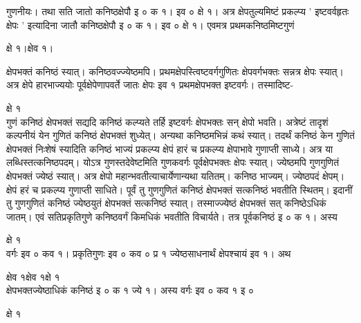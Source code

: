 \documentclass[11pt, openany]{book}
\begin{document}
\begin{sloppypar}
\hangindent=0.2in गुणनीयः। तथा सति जातो कनिष्ठक्षेपौ इ ० क १। इव ० क्षे १। अत्र क्षेपतुल्यमिष्टं प्रकल्प्य ' इष्टवर्वहृतः क्षेपः ' इत्यादिना जातौ कनिष्ठक्षेपौ इ ० क १। इव ० क्षे १। एवमत्र प्रथमकनिष्ठमिष्टगुणं 

\hspace{3in}क्षे १।\hspace{0.3in}क्षेव १।

\hangindent=0.2in क्षेपभक्तं कनिष्ठं स्यात्। कनिष्ठवज्ज्येष्ठमपि। प्रथमक्षेपस्त्विष्टवर्गगुणितः क्षेपवर्गभक्तः सन्नत्र क्षेपः स्यात्। अत्र क्षेपे हारभाज्ययोः पूर्वक्षेपेणापवर्ते जातः क्षेपः इव १ प्रथमक्षेपभक्त इष्टवर्गः। तस्मादिष्ट-

\hspace{3.4in}क्षे १\\

\hangindent=0.2in गुणं कनिष्ठं क्षेपभक्तं सद्यदि कनिष्ठं कल्प्यते तर्हि इष्टवर्गः क्षेपभक्तः सन् क्षेपो भवति। अत्रेष्टं तादृशं कल्पनीयं येन गुणितं कनिष्ठं क्षेपभक्तं शुध्येत्। अन्यथा कनिष्ठमभिन्नं कथं स्यात्। तदर्थं कनिष्ठं केन गुणितं क्षेपभक्तं निःशेषं स्यादिति कनिष्ठं भाज्यं प्रकल्प्य क्षेपं हारं च प्रकल्प्य क्षेपाभावे गुणाप्ती साध्ये। अत्र या लब्धिस्तत्कनिष्ठपदम्। योऽत्र गुणस्तदेवेष्टमिति गुणकवर्गः पूर्वक्षेपभक्तः क्षेपः स्यात्। ज्येष्ठमपि गुणगुणितं क्षेपभक्तं ज्येष्ठं स्यात्। अत्र क्षेपो महान्भवतीत्याचार्येणान्यथा यतितम्। कनिष्ठ भाज्यम्। ज्येष्ठपदं क्षेपम्। क्षेपं हरं च प्रकल्प्य गुणाप्ती साधिते। पूर्वं तु गुणगुणितं कनिष्ठं क्षेपभक्तं सत्कनिष्ठं भवतीति स्थितम्। इदानीं तु गुणगुणितं कनिष्ठं ज्येष्ठयुतं क्षेपभक्तं सत्कनिष्ठं स्यात्। तस्माज्ज्येष्ठं क्षेपभक्तं सत् कनिष्ठेऽधिकं जातम्। एवं सतिप्रकृतिगुणे कनिष्ठवर्गं किमधिकं भवतीति विचार्यते। तत्र पूर्वकनिष्ठं इ ० क १। अस्य 

\hspace{3in}क्षे १\\

\hangindent=0.2in वर्गः इव ० कव १। प्रकृतिगुणः इव ० कव ० प्र १ ज्येष्ठसाधनार्थं क्षेपश्चायं इव १। अथ

\hspace{0.75in}क्षेव १\hspace{1.25in}क्षेव १\hspace{1.9in}क्षे १\\

\hangindent=0.2in क्षेपभक्तज्येष्ठाधिकं कनिष्ठं इ ० क १ ज्ये १। अस्य वर्गः इव ० कव १ इ ०

\hspace{2.3in}क्षे १\\


\end{sloppypar}
\end{document}
